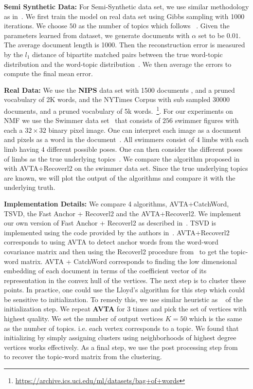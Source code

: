 \documentclass[]{article}
\begin{document}
	
	
	\noindent \textbf{Semi Synthetic Data:} For Semi-Synthetic data set, we use similar methodology as in~\cite{arora2013practical}. We first train the model on real data set using Gibbs sampling with 1000 iterations. We choose $50$ as the number of topics which follows ~\cite{bansal2014provable,}.  Given the parameters learned from dataset, we generate documents with $\alpha$ set to be $0.01$. The average document length is 1000.  Then the reconstruction error is measured by the $l_1$ distance of bipartite matched pairs between  the true word-topic distribution and the  word-topic distribution~\cite{arora2013practical}. We then average the errors to compute the final mean error.
	
	\noindent \textbf{Real Data:} We use the \textbf{NIPS} data set with 1500 documents , and a pruned vocabulary of 2K words, and the NYTimes Corpus with sub sampled 30000 documents, and a pruned vocabulary of 5k words.~\footnote{\url{https://archive.ics.uci.edu/ml/datasets/bag+of+words}}. For our experiments on NMF we use the Swimmer data set~\cite{donoho2003does} that consists of $256$ swimmer figures with each a $32 \times 32$ binary pixel image. One can interpret each image as a document and pixels as a word in the document~\cite{ding2013topic}. All swimmers consist of $4$ limbs with each limb having $4$ different possible poses. One can then consider the different poses of limbs as the true underlying topics~\cite{donoho2003does}. We compare the algorithm proposed in~\cite{arora2012computing} with {AVTA+Recoverl2} on the swimmer data set.  Since the true underlying topics are known, we will plot the output of the algorithms and compare it with the underlying truth.
	
	
	\noindent \textbf{Implementation Details:} We compare 4 algorithms, {AVTA+CatchWord}, {TSVD}, the {Fast Anchor + Recoverl2} and the {AVTA+Recoverl2}. We implement our own version of Fast Anchor + Recoverl2 as described in~\cite{arora2013practical}. TSVD is implemented using the code provided by the authors in~\cite{bansal2014provable}. AVTA+Recoverl2 corresponds to using AVTA to detect anchor words from the word-word covariance matrix and then using the Recoverl2 procedure from~\cite{arora2013practical} to get the topic-word matrix. AVTA + CatchWord corresponds to finding the low dimensional embedding of each document in terms of the coefficient vector of its representation in the convex hull of the vertices. The next step is to cluster these points. In practice, one could use the Lloyd's algorithm for this step which could be sensitive to initialization.   To remedy this, we use similar heuristic as ~\cite{bansal2014provable} of the initialization step. We repeat \textbf{AVTA} for $3$ times and pick the set of vertices with highest quality. We set the number of output vertices $K=50$ which is the same as the number of topics. i.e. each vertex corresponds to a topic. We found that initializing by simply assigning clusters using neighborhoods of highest degree vertices works effectively. As a final step, we use the post processing step from~\cite{bansal2014provable} to recover the topic-word matrix from the clustering. 
	
\end{document}
